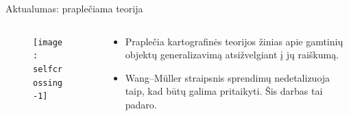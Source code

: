 \documentclass[14pt]{beamer}
\newcommand{\WM}{Wang--M{\"u}ller}
\begin{document}
\begin{frame}[fragile]{Aktualumas: praplečiama teorija}
  \begin{columns}[c]
    \begin{column}{.3\textwidth}
      \begin{figure}[ht]
        \texttt{[image: selfcrossing-1]}
      \end{figure}
    \end{column}
    \begin{column}{.7\textwidth}
      \begin{itemize}[<+->]

        \item Praplečia kartografinės teorijos žinias apie gamtinių objektų
          generalizavimą atsižvelgiant į jų raiškumą.

        \item {\WM} straipsnis sprendimų nedetalizuoja taip, kad būtų
          galima pritaikyti. Šis darbas tai padaro.

      \end{itemize}
    \end{column}
  \end{columns}
\end{frame}
\end{document}
